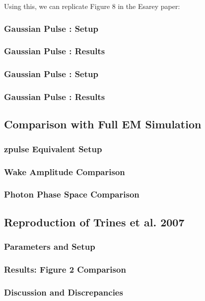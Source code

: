    Using this, we can replicate Figure 8 in the Esarey paper:
    
    \subsubsection{Gaussian Pulse : Setup}

        

    \subsubsection{Gaussian Pulse : Results}


    \subsubsection{Gaussian Pulse : Setup}


    \subsubsection{Gaussian Pulse : Results}




  \subsection{Comparison with Full EM Simulation}
    \subsubsection{zpulse Equivalent Setup}
    \subsubsection{Wake Amplitude Comparison}
    \subsubsection{Photon Phase Space Comparison}
  \subsection{Reproduction of Trines et al. 2007}
    \subsubsection{Parameters and Setup}
    \subsubsection{Results: Figure 2 Comparison}
    \subsubsection{Discussion and Discrepancies}
